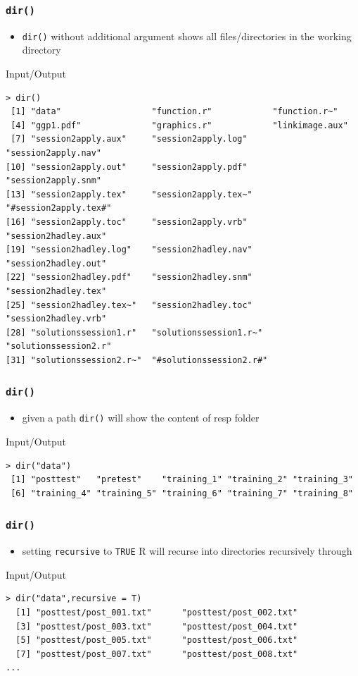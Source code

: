\documentclass[xcolor={table},c]{beamer}
\begin{document}
\begin{frame}[fragile]\frametitle{\texttt{dir()}}
  \begin{itemize}
  \item \texttt{dir()} without additional argument shows all files/directories in the working directory
  \end{itemize}
  \begin{exampleblock}{Input/Output}\scriptsize
\begin{verbatim}
> dir()
 [1] "data"                  "function.r"            "function.r~"          
 [4] "ggp1.pdf"              "graphics.r"            "linkimage.aux"        
 [7] "session2apply.aux"     "session2apply.log"     "session2apply.nav"    
[10] "session2apply.out"     "session2apply.pdf"     "session2apply.snm"    
[13] "session2apply.tex"     "session2apply.tex~"    "#session2apply.tex#"  
[16] "session2apply.toc"     "session2apply.vrb"     "session2hadley.aux"   
[19] "session2hadley.log"    "session2hadley.nav"    "session2hadley.out"   
[22] "session2hadley.pdf"    "session2hadley.snm"    "session2hadley.tex"   
[25] "session2hadley.tex~"   "session2hadley.toc"    "session2hadley.vrb"   
[28] "solutionssession1.r"   "solutionssession1.r~"  "solutionssession2.r"  
[31] "solutionssession2.r~"  "#solutionssession2.r#"
\end{verbatim}
  \end{exampleblock}
\end{frame}


\begin{frame}[fragile]\frametitle{\texttt{dir()}}
  \begin{itemize}
  \item given a path \texttt{dir()} will show the content of resp folder
  \end{itemize}
  \begin{exampleblock}{Input/Output}\scriptsize
\begin{verbatim}
> dir("data")
 [1] "posttest"   "pretest"    "training_1" "training_2" "training_3"
 [6] "training_4" "training_5" "training_6" "training_7" "training_8"
\end{verbatim}
  \end{exampleblock}
\end{frame}


\begin{frame}[fragile]\frametitle{\texttt{dir()}}
  \begin{itemize}
  \item setting \texttt{recursive} to \texttt{TRUE} R will recurse into directories recursively through 
  \end{itemize}
  \begin{exampleblock}{Input/Output}\scriptsize
\begin{verbatim}
> dir("data",recursive = T)
  [1] "posttest/post_001.txt"      "posttest/post_002.txt"     
  [3] "posttest/post_003.txt"      "posttest/post_004.txt"     
  [5] "posttest/post_005.txt"      "posttest/post_006.txt"     
  [7] "posttest/post_007.txt"      "posttest/post_008.txt"     
...
\end{verbatim}
  \end{exampleblock}
\end{frame}
\end{document}
